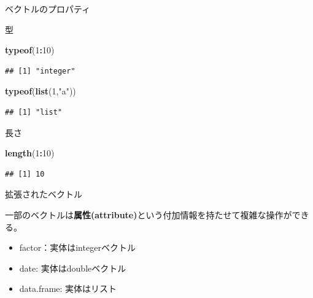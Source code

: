 \documentclass[ignorenonframetext,]{beamer}
\newenvironment{Shaded}{\begin{snugshade}}{\end{snugshade}}
\newcommand{\KeywordTok}[1]{\textcolor[rgb]{0.13,0.29,0.53}{\textbf{#1}}}
\newcommand{\DecValTok}[1]{\textcolor[rgb]{0.00,0.00,0.81}{#1}}
\newcommand{\StringTok}[1]{\textcolor[rgb]{0.31,0.60,0.02}{#1}}
\newcommand{\OperatorTok}[1]{\textcolor[rgb]{0.81,0.36,0.00}{\textbf{#1}}}
\newcommand{\NormalTok}[1]{#1}
\providecommand{\tightlist}{%
  \setlength{\itemsep}{0pt}\setlength{\parskip}{0pt}}
\begin{document}
\begin{frame}[fragile]{ベクトルのプロパティ}

\begin{block}{型}

\begin{Shaded}
\begin{Highlighting}[]
\KeywordTok{typeof}\NormalTok{(}\DecValTok{1}\OperatorTok{:}\DecValTok{10}\NormalTok{)}
\end{Highlighting}
\end{Shaded}

\begin{verbatim}
## [1] "integer"
\end{verbatim}

\begin{Shaded}
\begin{Highlighting}[]
\KeywordTok{typeof}\NormalTok{(}\KeywordTok{list}\NormalTok{(}\DecValTok{1}\NormalTok{,}\StringTok{"a"}\NormalTok{))}
\end{Highlighting}
\end{Shaded}

\begin{verbatim}
## [1] "list"
\end{verbatim}

\end{block}

\begin{block}{長さ}

\begin{Shaded}
\begin{Highlighting}[]
\KeywordTok{length}\NormalTok{(}\DecValTok{1}\OperatorTok{:}\DecValTok{10}\NormalTok{)}
\end{Highlighting}
\end{Shaded}

\begin{verbatim}
## [1] 10
\end{verbatim}

\end{block}

\end{frame}

\begin{frame}{拡張されたベクトル}

一部のベクトルは\textbf{属性(attribute)}という付加情報を持たせて複雑な操作ができる。

\begin{itemize}
\tightlist
\item
  factor：実体はintegerベクトル
\item
  date: 実体はdoubleベクトル
\item
  data.frame: 実体はリスト
\end{itemize}

\end{frame}
\end{document}
